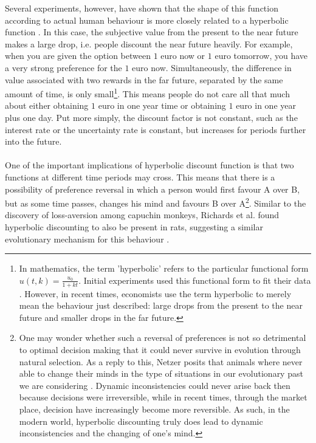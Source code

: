 \documentclass[a4paper,10pt]{article}
\numberwithin{equation}{section}
\begin{document}
Several experiments, however, have shown that the shape of this function according to actual human behaviour is more closely related to a hyperbolic function \cite{Green1994, Rachlin1991}. In this case, the subjective value from the present to the near future makes a large drop, i.e. people discount the near future heavily. For example, when you are given the option between $1$ euro now or $1$ euro tomorrow, you have a very strong preference for the $1$ euro now. Simultaneously, the difference in value associated with two rewards in the far future, separated by the same amount of time, is only small\footnote{In mathematics, the term 'hyperbolic' refers to the particular functional form $u(t, k)=\frac{u_0}{1+k t}$. Initial experiments used this functional form to fit their data \cite{Richards1997}. However, in recent times, economists use the term hyperbolic to merely mean the behaviour just described: large drops from the present to the near future and smaller drops in the far future.}. This means people do not care all that much about either obtaining $1$ euro in one year time or obtaining $1$ euro in one year plus one day. Put more simply, the discount factor is not constant, such as the interest rate or the uncertainty rate is constant, but increases for periods further into the future.\\
\\
One of the important implications of hyperbolic discount function is that two functions at different time periods may cross. This means that there is a possibility of preference reversal in which a person would first favour A over B, but as some time passes, changes his mind and favours B over A\footnote{One may wonder whether such a reversal of preferences is not so detrimental to optimal decision making that it could never survive in evolution through natural selection. As a reply to this, Netzer posits that animals where never able to change their minds in the type of situations in our evolutionary past we are considering \cite{Netzer2009}. Dynamic inconsistencies could never arise back then because decisions were irreversible, while in recent times, through the market place, decision have increasingly become more reversible. As such, in the modern world, hyperbolic discounting truly does lead to dynamic inconsistencies and the changing of one's mind.}. Similar to the discovery of loss-aversion among capuchin monkeys, Richards et al. found hyperbolic discounting to also be present in rats, suggesting a similar evolutionary mechanism for this behaviour \cite{Richards1997}.\\
\end{document}
